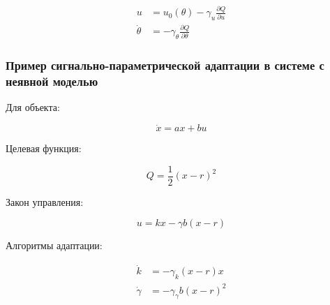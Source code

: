 \documentclass[a4paper,14pt]{extarticle} %
\begin{document}
\begin{equation}
\begin{aligned}
u &= u_{0}(\theta) - \gamma_{u} \frac{\partial Q}{\partial u} \\
\dot{\theta} &= -\gamma_{\theta} \frac{\partial Q}{\partial \theta}
\end{aligned}
\end{equation}

\subsubsection{Пример сигнально-параметрической адаптации в системе с неявной моделью}
Для объекта:

\begin{equation}
\dot{x} = ax + bu
\end{equation}

Целевая функция:

\begin{equation}
Q = \frac{1}{2}(x - r)^2
\end{equation}

Закон управления:

\begin{equation}
u = kx - \gamma b(x - r)
\end{equation}

Алгоритмы адаптации:

\begin{equation}
\begin{aligned}
\dot{k} &= -\gamma_k (x - r)x \\
\dot{\gamma} &= -\gamma_{\gamma} b(x - r)^2
\end{aligned}
\end{equation}
\end{document}
